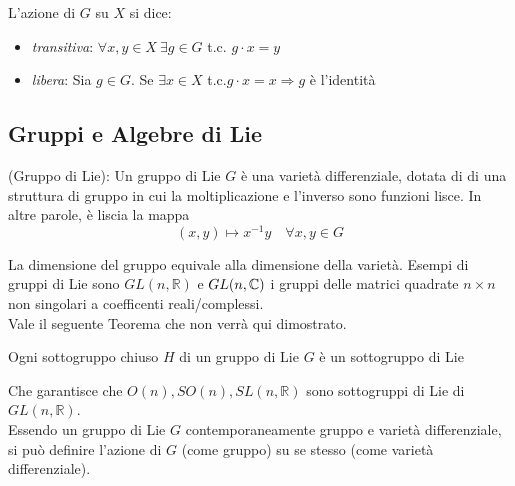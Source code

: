 L'azione di $G$ su $X$ si dice:
\begin{itemize}
   \item \emph{transitiva}: \quad $\forall x,y \in X \: \exists g \in G$ t.c. $g\cdot x = y$
   \item \emph{libera}: \quad Sia $g \in G$. Se $\exists x \in X$ t.c.$ g\cdot x = x
      \Rightarrow g$ è l'identità
\end{itemize}
\subsection{Gruppi e Algebre di Lie}

\begin{definition}{(Gruppo di Lie):}\label{def:liegroup}
   Un gruppo di Lie $G$ è una varietà differenziale, dotata di di una struttura
   di gruppo in cui la moltiplicazione e l'inverso sono funzioni lisce.
   In altre parole, è liscia la mappa
      $$ (x,y) \mapsto x^{-1}y \quad \forall x,y \in G$$
\end{definition}
La dimensione del gruppo equivale alla dimensione della varietà.
Esempi di gruppi di Lie sono $GL(n,\mathbb{R})$ e $GL(n,\mathbb{C})$ i gruppi
delle matrici quadrate $n \times n$ non singolari a coefficenti reali/complessi.\\
Vale il seguente Teorema che non verrà qui dimostrato.
\begin{theorem}
   Ogni sottogruppo chiuso $H$ di un gruppo di Lie $G$ è un sottogruppo di Lie
\end{theorem}
Che garantisce che $O(n), SO(n), SL(n,\mathbb{R})$ sono sottogruppi di Lie di
$GL(n,\mathbb{R})$.\\

Essendo un gruppo di Lie $G$ contemporaneamente gruppo e varietà differenziale, si
può definire l'azione di $G$ (come gruppo) su se stesso (come varietà differenziale).

